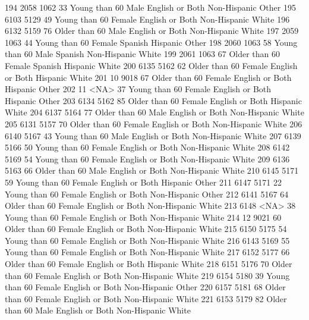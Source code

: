 \documentclass[
  letterpaper,
  DIV=11,
  numbers=noendperiod]{scrreprt}
\newenvironment{Shaded}{\begin{snugshade}}{\end{snugshade}}
\newcommand{\NormalTok}[1]{\textcolor[rgb]{0.00,0.23,0.31}{#1}}
\begin{document}
\begin{Shaded}
\begin{Highlighting}[]
\NormalTok{194 2058 1062  33 Young than 60   Male English or Both Non{-}Hispanic      Other}
\NormalTok{195 6103 5129  49 Young than 60 Female English or Both Non{-}Hispanic      White}
\NormalTok{196 6132 5159  76 Older than 60   Male English or Both Non{-}Hispanic      White}
\NormalTok{197 2059 1063  44 Young than 60 Female         Spanish     Hispanic      Other}
\NormalTok{198 2060 1063  58 Young than 60   Male         Spanish Non{-}Hispanic      White}
\NormalTok{199 2061 1063  67 Older than 60 Female         Spanish     Hispanic      White}
\NormalTok{200 6135 5162  62 Older than 60 Female English or Both     Hispanic      White}
\NormalTok{201   10 9018  67 Older than 60 Female English or Both     Hispanic      Other}
\NormalTok{202   11 \textless{}NA\textgreater{}  37 Young than 60 Female English or Both     Hispanic      Other}
\NormalTok{203 6134 5162  85 Older than 60 Female English or Both     Hispanic      White}
\NormalTok{204 6137 5164  77 Older than 60   Male English or Both Non{-}Hispanic      White}
\NormalTok{205 6131 5157  70 Older than 60 Female English or Both Non{-}Hispanic      White}
\NormalTok{206 6140 5167  43 Young than 60   Male English or Both Non{-}Hispanic      White}
\NormalTok{207 6139 5166  50 Young than 60 Female English or Both Non{-}Hispanic      White}
\NormalTok{208 6142 5169  54 Young than 60 Female English or Both Non{-}Hispanic      White}
\NormalTok{209 6136 5163  66 Older than 60   Male English or Both Non{-}Hispanic      White}
\NormalTok{210 6145 5171  59 Young than 60 Female English or Both     Hispanic      Other}
\NormalTok{211 6147 5171  22 Young than 60 Female English or Both Non{-}Hispanic      Other}
\NormalTok{212 6141 5167  64 Older than 60 Female English or Both Non{-}Hispanic      White}
\NormalTok{213 6148 \textless{}NA\textgreater{}  38 Young than 60 Female English or Both Non{-}Hispanic      White}
\NormalTok{214   12 9021  60 Older than 60 Female English or Both Non{-}Hispanic      White}
\NormalTok{215 6150 5175  54 Young than 60 Female English or Both Non{-}Hispanic      White}
\NormalTok{216 6143 5169  55 Young than 60 Female English or Both Non{-}Hispanic      White}
\NormalTok{217 6152 5177  66 Older than 60 Female English or Both     Hispanic      White}
\NormalTok{218 6151 5176  70 Older than 60 Female English or Both Non{-}Hispanic      White}
\NormalTok{219 6154 5180  39 Young than 60 Female English or Both Non{-}Hispanic      Other}
\NormalTok{220 6157 5181  68 Older than 60 Female English or Both Non{-}Hispanic      White}
\NormalTok{221 6153 5179  82 Older than 60   Male English or Both Non{-}Hispanic      White}

\end{Highlighting}
\end{Shaded}
\end{document}
